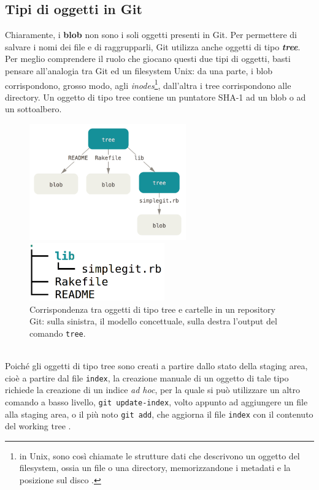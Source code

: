 \documentclass[12pt]{article}
\def\code#1{\texttt{#1}}
\begin{document}
\subsection{Tipi di oggetti in Git}
Chiaramente, i \textbf{blob} non sono i soli oggetti presenti in Git.
Per permettere di salvare i nomi dei file e di raggrupparli, Git utilizza anche oggetti di tipo \textit{\textbf{tree}}. 
Per meglio comprendere il ruolo che giocano questi due tipi di oggetti, basti pensare all'analogia tra Git ed un filesystem Unix: da una parte, i blob corrispondono, grosso modo, agli \textit{inodes}\footnote{in Unix, sono così chiamate le strutture dati che descrivono un oggetto del filesystem, ossia un file o una directory, memorizzandone i metadati e la posizione sul disco \cite{winode}.}, dall'altra i tree corrispondono alle directory. 
Un oggetto di tipo tree contiene un puntatore SHA-1 ad un blob o ad un sottoalbero.
\begin{figure}[h]
	\centering
	\begin{minipage}{7cm}
		\includegraphics[height=5cm]{data-model-graph.png}
	\end{minipage}
	\qquad
	\begin{minipage}{7cm}
		\includegraphics[height=2.5cm]{data-model-tree.png}
	\end{minipage}
	\caption{Corrispondenza tra oggetti di tipo tree e cartelle in un repository Git: sulla sinistra, il modello concettuale, sulla destra l'output del comando \code{tree}.}
\end{figure}
\ \\
Poiché gli oggetti di tipo tree sono creati a partire dallo stato della staging area, cioè a partire dal file \code{index}, la creazione manuale di un oggetto di tale tipo richiede la creazione di un indice \textit{ad hoc}, per la quale si può utilizzare un altro comando a basso livello, \code{git update-index}, volto appunto ad aggiungere un file alla staging area, o il più noto \code{git add}, che aggiorna il file \code{index} con il contenuto del working tree \cite{git_ref}.
\end{document}

